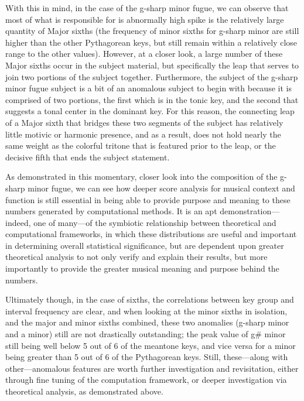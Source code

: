 With this in mind, in the case of the g-sharp minor fugue, we can
observe that most of what is responsible for is abnormally high spike is
the relatively large quantity of Major sixths (the frequency of minor
sixths for g-sharp minor are still higher than the other Pythagorean
keys, but still remain within a relatively close range to the other
values). However, at a closer look, a large number of these Major sixths
occur in the subject material, but specifically the leap that serves to
join two portions of the subject together. Furthermore, the subject of
the g-sharp minor fugue subject is a bit of an anomalous subject to
begin with because it is comprised of two portions, the first which is
in the tonic key, and the second that suggests a tonal center in the
dominant key. For this reason, the connecting leap of a Major sixth that
bridges these two segments of the subject has relatively little motivic
or harmonic presence, and as a result, does not hold nearly the same
weight as the colorful tritone that is featured prior to the leap, or
the decisive fifth that ends the subject statement.


    \begin{center}
    \end{center}
    


    \begin{center}
    \end{center}
    
    As demonstrated in this momentary, closer look into the composition of
the g-sharp minor fugue, we can see how deeper score analysis for
musical context and function is still essential in being able to provide
purpose and meaning to these numbers generated by computational methods.
It is an apt demonstration---indeed, one of many---of the
symbiotic relationship between theoretical and computational frameworks,
in which these distributions are useful and important in determining
overall statistical significance, but are dependent upon greater
theoretical analysis to not only verify and explain their results, but
more importantly to provide the greater musical meaning and purpose
behind the numbers.

Ultimately though, in the case of sixths, the correlations between key
group and interval frequency are clear, and when looking at the minor
sixths in isolation, and the major and minor sixths combined, these two
anomalies (g-sharp minor and a minor) still are not drastically
outstanding; the peak value of g\# minor still being well below 5 out of
6 of the meantone keys, and vice versa for a minor being greater than 5
out of 6 of the Pythagorean keys. Still, these---along with
other---anomalous features are worth further investigation and
revisitation, either through fine tuning of the computation framework,
or deeper investigation via theoretical analysis, as demonstrated above.

